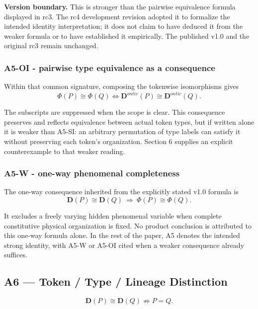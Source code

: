 \documentclass[
  11pt,
  a4paper,
]{article}
\begin{document}
\textbf{Version boundary.} This is stronger than the pairwise
equivalence formula displayed in rc3. The rc4 development revision
adopted it to formalize the intended identity interpretation; it does
not claim to have deduced it from the weaker formula or to have
established it empirically. The published v1.0 and the original rc3
remain unchanged.

\hypertarget{a5-oi---pairwise-type-equivalence-as-a-consequence}{%
\subsubsection{A5-OI - pairwise type equivalence as a
consequence}\label{a5-oi---pairwise-type-equivalence-as-a-consequence}}

Within that common signature, composing the tokenwise isomorphisms gives
\nopagebreak[4]
\[
\Phi(P)\cong\Phi(Q)
\iff
\mathbf D^{ontic}(P)\cong\mathbf D^{ontic}(Q).
\]

The subscripts are suppressed when the scope is clear. This consequence
preserves and reflects equivalence between actual token types, but if
written alone it is weaker than A5-SI: an arbitrary permutation of type
labels can satisfy it without preserving each token's organization.
Section 6 supplies an explicit counterexample to that weaker reading.

\hypertarget{a5-w---one-way-phenomenal-completeness}{%
\subsubsection{A5-W - one-way phenomenal
completeness}\label{a5-w---one-way-phenomenal-completeness}}

The one-way consequence inherited from the explicitly stated v1.0
formula is
\nopagebreak[4]
\[
\mathbf D(P)\cong\mathbf D(Q)
\ \Longrightarrow\ \Phi(P)\cong\Phi(Q).
\]

It excludes a freely varying hidden phenomenal variable when complete
constitutive physical organization is fixed. No product conclusion is
attributed to this one-way formula alone. In the rest of the paper, A5
denotes the intended strong identity, with A5-W or A5-OI cited when a
weaker consequence already suffices.

\hypertarget{a6-token-type-lineage-distinction}{%
\subsection{A6 --- Token / Type / Lineage
Distinction}\label{a6-token-type-lineage-distinction}}
\nopagebreak[4]
\[
\boxed{
\mathbf D(P)\cong\mathbf D(Q)
\not\Rightarrow
P=Q.
}
\]
\end{document}
